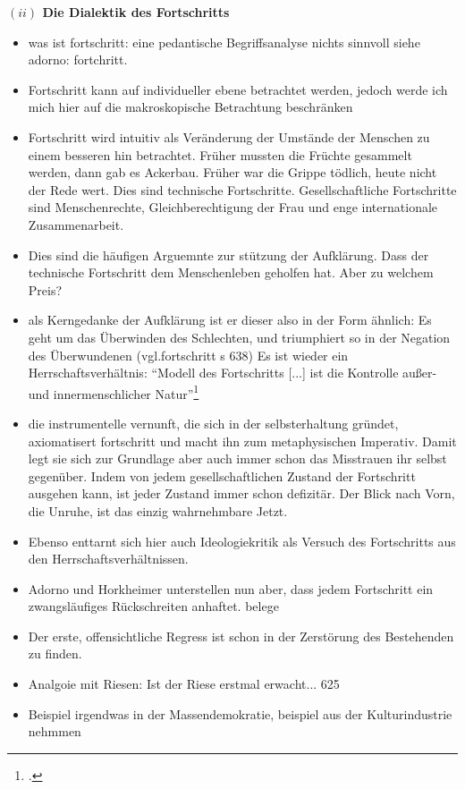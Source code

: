 \documentclass[a4paper, 12pt]{article}
\begin{document}
\begin{onehalfspace}
\vspace{5mm}
\noindent\textbf{$(ii)$ Die Dialektik des Fortschritts}

\noindent 

\begin{itemize}
  \item was ist fortschritt: eine pedantische Begriffsanalyse nichts sinnvoll siehe adorno: fortchritt. 
  \item Fortschritt kann auf individueller ebene betrachtet werden, jedoch werde ich mich hier auf die makroskopische Betrachtung beschränken
  \item Fortschritt wird intuitiv als Veränderung der Umstände der Menschen zu einem besseren hin betrachtet. Früher mussten die Früchte gesammelt werden, dann gab es Ackerbau. Früher war die Grippe tödlich, heute nicht der Rede wert. Dies sind technische Fortschritte. Gesellschaftliche Fortschritte sind Menschenrechte, Gleichberechtigung der Frau und enge internationale Zusammenarbeit. 
  \item Dies sind die häufigen Arguemnte zur stützung der Aufklärung. Dass der technische Fortschritt dem Menschenleben geholfen hat. Aber zu welchem Preis?
  \item als Kerngedanke der Aufklärung ist er dieser also in der Form ähnlich: Es geht um das Überwinden des Schlechten, und triumphiert so in der Negation des Überwundenen (vgl.fortschritt s 638) Es ist wieder ein Herrschaftsverhältnis: "`Modell des Fortschritts [...] ist die Kontrolle außer- und innermenschlicher Natur"'\footnote{\Cite[Siehe][S. 623]{fortschritt}.}
  \item die instrumentelle vernunft, die sich in der selbsterhaltung gründet, axiomatisert fortschritt und macht ihn zum metaphysischen Imperativ. Damit legt sie sich zur Grundlage aber auch immer schon das Misstrauen ihr selbst gegenüber. Indem von jedem gesellschaftlichen Zustand der Fortschritt ausgehen kann, ist jeder Zustand immer schon defizitär. Der Blick nach Vorn, die Unruhe, ist das einzig wahrnehmbare Jetzt.
  \item Ebenso enttarnt sich hier auch Ideologiekritik als Versuch des Fortschritts aus den Herrschaftsverhältnissen. 
  \item Adorno und Horkheimer unterstellen nun aber, dass jedem Fortschritt ein zwangsläufiges Rückschreiten anhaftet. belege
  \item Der erste, offensichtliche Regress ist schon in der Zerstörung des Bestehenden zu finden.
  \item Analgoie mit Riesen: Ist der Riese erstmal erwacht... 625
  \item Beispiel irgendwas in der Massendemokratie, beispiel aus der Kulturindustrie nehmmen
\end{itemize}



\end{onehalfspace}
\end{document}
